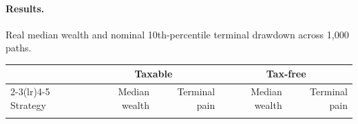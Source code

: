 \documentclass[11pt]{article}
\begin{document}
\paragraph{Results.} Real median wealth and nominal 10th-percentile terminal drawdown across
1{,}000 paths.

\begin{center}
\begin{tabular}{@{}lrrrr@{}}
\toprule
& \multicolumn{2}{c}{Taxable} & \multicolumn{2}{c}{Tax-free} \\
\cmidrule(lr){2-3}\cmidrule(lr){4-5}
Strategy & Median wealth & Terminal pain & Median wealth & Terminal pain \\
\midrule
\\
\bottomrule
\end{tabular}
\end{center}
\end{document}
